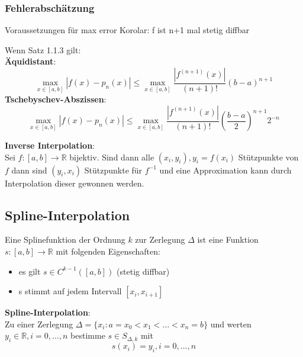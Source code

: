 \documentclass[
	ngerman,
	accentcolor=9c,%
	type=intern,
	marginpar=false
	]{tudapub}
\begin{document}
       \subsubsection{Fehlerabschätzung}
       \setcounter{satz}{2}
       \begin{satz}
            Voraussetzungen für max error Korolar: f ist n+1 mal stetig diffbar
       \end{satz}
       \begin{korolar} 
            
            Wenn Satz 1.1.3 gilt:\\
            \textbf{Äquidistant}:
            \begin{equation*}
                \max_{x \in [a,b]} |f(x) - p_n(x)| \leq \max_{x \in [a,b]} \dfrac{|f^{(n+1)}(x)|}{(n+1)!}(b-a)^{n+1}
            \end{equation*}
            \textbf{Tschebyschev-Abszissen}:
            \begin{equation*}
                \max_{x \in [a,b]} |f(x) - p_n(x)| \leq \max_{x \in [a,b]} \dfrac{|f^{(n+1)}(x)|}{(n+1)!}\left(\dfrac{b-a}{2}\right)^{n+1}2^{-n}
            \end{equation*}
       \end{korolar}
       \textbf{Inverse Interpolation}:\\
       Sei $f:[a,b] \rightarrow \mathbb{R}$ bijektiv.
       Sind dann alle $(x_i,y_i), y_i = f(x_i)$ Stützpunkte von $f$
       dann sind $(y_i, x_i)$ Stützpunkte für $f^{-1}$ und eine Approximation kann durch Interpolation dieser
       gewonnen werden.

       \subsection{Spline-Interpolation}
            \begin{definition}
                Eine Splinefunktion der Ordnung $k$ zur Zerlegung $\Delta$ ist eine Funktion $s:[a,b]\rightarrow \mathbb{R}$ mit folgenden Eigenschaften:
                \begin{itemize}
                    \item es gilt $s \in C^{k-1}([a,b])$ (stetig diffbar)
                    \item s stimmt auf jedem Intervall $[x_i,x_{i+1}]$
                \end{itemize}
                \textbf{Spline-Interpolation}: \\
                Zu einer Zerlegung $\Delta = \{x_i:a = x_0 < x_1 < \dots < x_n = b\}$ und werten $y_i \in \mathbb{R}, i = 0, \dots, n$
                bestimme $s \in S_{\Delta,k}$ mit
                \begin{equation*}
                    s(x_i) = y_i, i=0,...,n
                \end{equation*}
            \end{definition}
\end{document}
